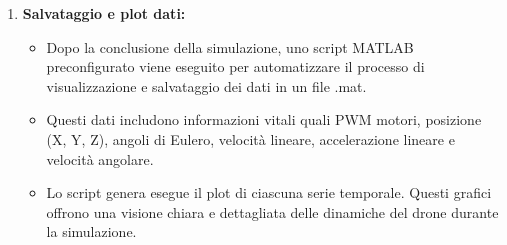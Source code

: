 \begin{enumerate}
\begin{itemize}
    \end{itemize}

    \item \textbf{Salvataggio e plot dati:}
    \begin{itemize}
        \item Dopo la conclusione della simulazione, uno script MATLAB preconfigurato viene eseguito per automatizzare il processo di visualizzazione e salvataggio dei dati in un file .mat.
        \item Questi dati includono informazioni vitali quali PWM motori, posizione (X, Y, Z), angoli di Eulero, velocità lineare, accelerazione lineare e velocità angolare.
        \item Lo script genera esegue il plot di ciascuna serie temporale. Questi grafici offrono una visione chiara e dettagliata delle dinamiche del drone durante la simulazione.
    \end{itemize}


\end{enumerate}
